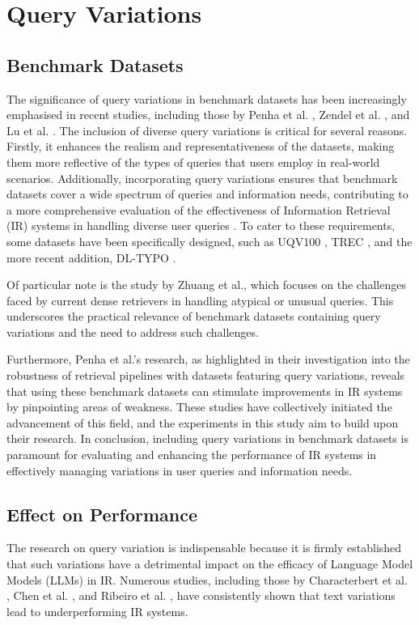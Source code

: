 \section{Query Variations}
\subsection{Benchmark Datasets}
The significance of query variations in benchmark datasets has been increasingly emphasised in recent studies, including those by Penha et al. \cite{penha2022}, Zendel et al. \cite{zendel}, and Lu et al. \cite{lu}. The inclusion of diverse query variations is critical for several reasons. Firstly, it enhances the realism and representativeness of the datasets, making them more reflective of the types of queries that users employ in real-world scenarios. Additionally, incorporating query variations ensures that benchmark datasets cover a wide spectrum of queries and information needs, contributing to a more comprehensive evaluation of the effectiveness of Information Retrieval (IR) systems in handling diverse user queries \cite{penha2022, characterbert, zendel}. To cater to these requirements, some datasets have been specifically designed, such as UQV100 \cite{uqv}, TREC \cite{trec}, and the more recent addition, DL-TYPO \cite{characterbert}.

Of particular note is the study by Zhuang et al., which focuses on the challenges faced by current dense retrievers in handling atypical or unusual queries. This underscores the practical relevance of benchmark datasets containing query variations and the need to address such challenges.

Furthermore, Penha et al.'s research, as highlighted in their investigation into the robustness of retrieval pipelines with datasets featuring query variations, reveals that using these benchmark datasets can stimulate improvements in IR systems by pinpointing areas of weakness. These studies have collectively initiated the advancement of this field, and the experiments in this study aim to build upon their research. In conclusion, including query variations in benchmark datasets is paramount for evaluating and enhancing the performance of IR systems in effectively managing variations in user queries and information needs.

\subsection{Effect on Performance}
The research on query variation is indispensable because it is firmly established that such variations have a detrimental impact on the efficacy of Language Model Models (LLMs) in IR. Numerous studies, including those by Characterbert et al. \cite{characterbert}, Chen et al. \cite{chen}, and Ribeiro et al. \cite{ribeiro}, have consistently shown that text variations lead to underperforming IR systems.

